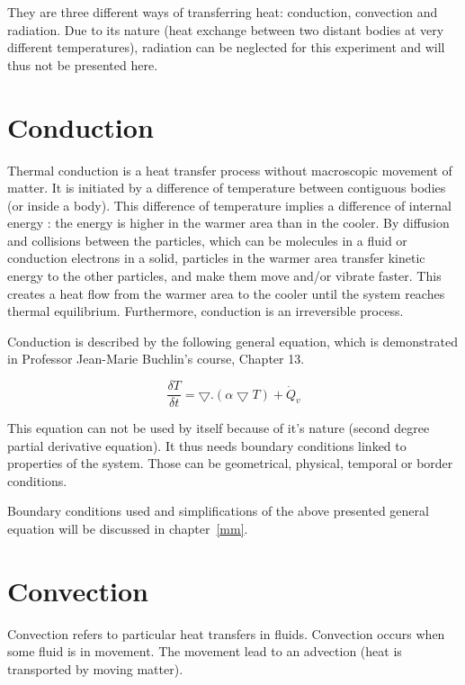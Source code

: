 \documentclass{report}
\begin{document}
	They are three different ways of transferring heat: conduction, convection and radiation. Due to its nature (heat exchange between two distant bodies at very different temperatures), radiation can be neglected for this experiment and will thus not be presented here.
	
	\section{Conduction}\label{cd}
	
	Thermal conduction is a heat transfer process without macroscopic movement of matter. It is initiated by a difference of temperature between contiguous bodies (or inside a body). This difference of temperature implies a difference of internal energy : the energy is higher in the warmer area than in the cooler. By diffusion and collisions between the particles, which can be molecules in a fluid or conduction electrons in a solid, particles in the warmer area transfer kinetic energy to the other particles, and make them move and/or vibrate faster. This creates a heat flow from the warmer area to the cooler until the system reaches thermal equilibrium. Furthermore, conduction is an irreversible process.
	
	Conduction is described by the following general equation, which is demonstrated in Professor Jean-Marie Buchlin's course\cite{Buchlin}, Chapter 13.
	
	\begin{equation}
		\frac{\delta T}{\delta t} = \bigtriangledown . (\alpha \bigtriangledown T)+ \dot{Q}_v
	\end{equation}
	
	This equation can not be used by itself because of it's nature (second degree partial derivative equation). It thus needs boundary conditions linked to properties of the system. Those can be geometrical, physical, temporal or border conditions.
	
	Boundary conditions used and simplifications of the above presented general equation will be discussed in chapter~\ref{mm}.
	
	\section{Convection}\label{cv}
	
	Convection refers to particular heat transfers in fluids. Convection occurs when some fluid is in movement. The movement lead to an advection (heat is transported by moving matter).
	
\end{document}
